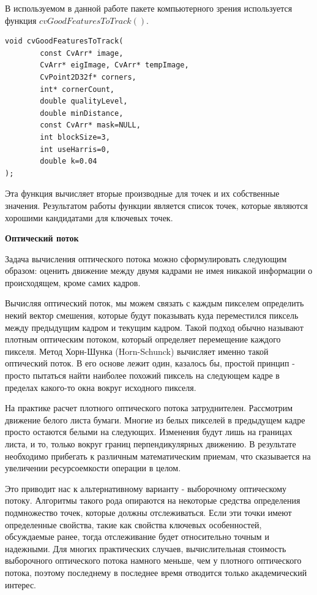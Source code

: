 В используемом в данной работе пакете компьютерного зрения используется функция  $cvGoodFeaturesToTrack()$.
\begin{verbatim}
void cvGoodFeaturesToTrack(
        const CvArr* image,
        CvArr* eigImage, CvArr* tempImage,
        CvPoint2D32f* corners,
        int* cornerCount,
        double qualityLevel,
        double minDistance,
        const CvArr* mask=NULL,
        int blockSize=3,
        int useHarris=0,
        double k=0.04 
);
\end{verbatim}
Эта функция вычисляет вторые производные для точек и их собственные значения. Результатом работы функции является список точек, которые являются хорошими кандидатами для ключевых точек.

\textbf{Оптический поток}

Задача вычисления оптического потока можно сформулировать следующим образом: оценить движение между двумя кадрами не имея никакой информации о происходящем, кроме самих кадров\cite{OpenCVBook}. 

Вычисляя оптический поток, мы можем связать с каждым пикселем определить некий вектор смешения, которые будут показывать куда переместился пиксель между предыдущим кадром и текущим кадром. Такой  подход обычно называют плотным оптическим потоком, который определяет перемещение каждого пикселя. Метод Хорн-Шунка (Horn-Schunck) вычисляет именно такой оптический поток. В его основе лежит один, казалось бы, простой принцип - просто пытаться найти наиболее похожий пиксель на следующем кадре в пределах какого-то окна вокруг исходного пикселя.

На практике расчет плотного оптического потока затруднителен. Рассмотрим движение белого листа бумаги. Многие из белых пикселей в предыдущем кадре просто остаются белыми на следующих. Изменения будут лишь на границах листа, и то, только вокруг границ перпендикулярных движению. В результате необходимо прибегать к различным математическим приемам, что сказывается на увеличении ресурсоемкости операции в целом. 

Это приводит нас к альтернативному варианту - выборочному оптическому потоку. Алгоритмы такого рода опираются на некоторые средства определения подмножество точек, которые должны отслеживаться. Если эти точки имеют определенные свойства, такие как свойства ключевых особенностей, обсуждаемые ранее, тогда отслеживание будет относительно точным и надежными. Для многих практических случаев, вычислительная стоимость выборочного оптического потока намного меньше, чем у плотного оптического потока, поэтому последнему в последнее время отводится только академический интерес.

